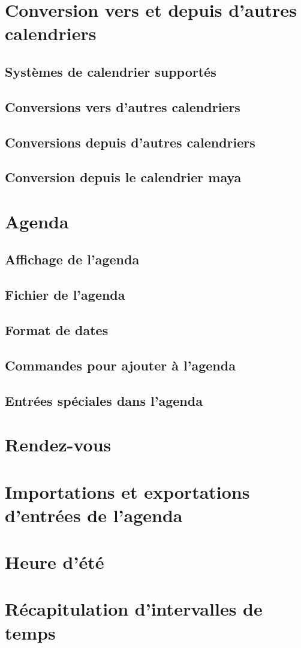\section{Conversion vers et depuis d'autres calendriers}\label{chap28sec9}
\subsection{Systèmes de calendrier supportés}\label{chap28sec9subsec1}
\subsection{Conversions vers d'autres calendriers}\label{chap28sec9subsec2}
\subsection{Conversions depuis d'autres calendriers}\label{chap28sec9subsec3}
\subsection{Conversion depuis le calendrier maya}\label{chap28sec9subsec4}
\section{Agenda}\label{chap28sec10}
\subsection{Affichage de l'agenda}\label{chap28sec10subsec1}
\subsection{Fichier de l'agenda}\label{chap28sec10subsec2}
\subsection{Format de dates}\label{chap28sec10subsec3}
\subsection{Commandes pour ajouter à l'agenda}\label{chap28sec10subsec4}
\subsection{Entrées spéciales dans l'agenda}\label{chap28sec10subsec5}
\section{Rendez-vous}\label{chap28sec11}
\section{Importations et exportations d'entrées de
  l'agenda}\label{chap28sec12} 
\section{Heure d'été}\label{chap28sec13}
\section{Récapitulation d'intervalles de temps}\label{chap28sec14}
